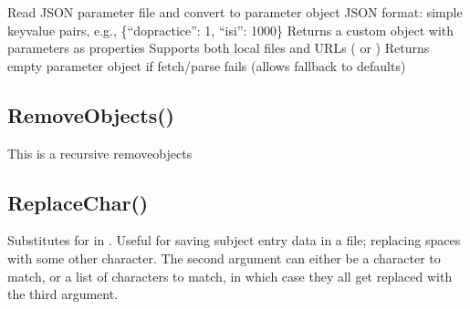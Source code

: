 \documentclass[letterpaper,10pt,english]{sphinxmanual}
\begin{document}
\sphinxAtStartPar
Read JSON parameter file and convert to parameter object
JSON format: simple key\sphinxhyphen{}value pairs, e.g., \{“dopractice”: 1, “isi”: 1000\}
Returns a custom object with parameters as properties
Supports both local files and URLs ( or )
Returns empty parameter object if fetch/parse fails (allows fallback to defaults)

\sphinxAtStartPar
{}

\begin{sphinxVerbatim}[commandchars=\\\{\}]
\end{sphinxVerbatim}

\ignorespaces 

\subsection{RemoveObjects()}
\label{\detokenize{reference/utility:removeobjects}}\label{\detokenize{reference/utility:index-35}}
\sphinxAtStartPar
{}

\sphinxAtStartPar
{}

\sphinxAtStartPar
This is a recursive removeobjects

\sphinxAtStartPar
{}

\begin{sphinxVerbatim}[commandchars=\\\{\}]
\end{sphinxVerbatim}

\ignorespaces 

\subsection{ReplaceChar()}
\label{\detokenize{reference/utility:replacechar}}\label{\detokenize{reference/utility:index-36}}
\sphinxAtStartPar
{}

\sphinxAtStartPar
Substitutes   for    in . Useful for saving subject entry data in a file;   replacing spaces with some other character.  The second argument can either be a character to match, or a list of characters to match, in which case they all get replaced with the third argument.
\end{document}
